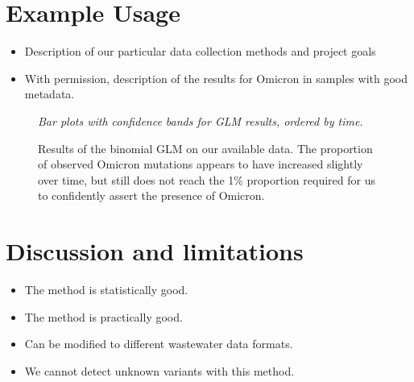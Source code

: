 \documentclass{article}
\newenvironment{tightemize}
{ \begin{itemize}
    \setlength{\itemsep}{0pt}
    \setlength{\parskip}{0pt}
    \setlength{\parsep}{0pt}     }
{ \end{itemize}                  }
\begin{document}
\section{Example Usage}

\begin{tightemize}
    \item Description of our particular data collection methods and project goals
    \item With permission, description of the results for Omicron in samples with good metadata.
\end{tightemize}

\begin{figure}[ht!]
\vspace{2cm}
\centering
\emph{Bar plots with confidence bands for GLM results, ordered by time.}
\vspace{2cm}
\caption{Results of the binomial GLM on our available data. The proportion of observed Omicron mutations appears to have increased slightly over time, but still does not reach the 1\% proportion required for us to confidently assert the presence of Omicron.}
\label{fig:binomial_results}
\end{figure}


\section{Discussion and limitations}

\begin{tightemize}
    \item The method is statistically good.
    \item The method is practically good.
    \item Can be modified to different wastewater data formats.
    \item We cannot detect unknown variants with this method.
\end{tightemize}


{}

\end{document}
